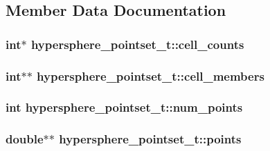 \subsection{Member Data Documentation}
\hypertarget{structhypersphere__pointset__t_aaf511e7f891ea0d2c9bb8a8e94a4b085}{
\subsubsection[{cell\_\-counts}]{\setlength{\rightskip}{0pt plus 5cm}int$\ast$ {\bf hypersphere\_\-pointset\_\-t::cell\_\-counts}}}
\label{structhypersphere__pointset__t_aaf511e7f891ea0d2c9bb8a8e94a4b085}
\hypertarget{structhypersphere__pointset__t_aa7cfbde979cf3d0cda21b816b2cc1672}{
\subsubsection[{cell\_\-members}]{\setlength{\rightskip}{0pt plus 5cm}int$\ast$$\ast$ {\bf hypersphere\_\-pointset\_\-t::cell\_\-members}}}
\label{structhypersphere__pointset__t_aa7cfbde979cf3d0cda21b816b2cc1672}
\hypertarget{structhypersphere__pointset__t_a35cb19e7a308c03236f28540a867e167}{
\subsubsection[{num\_\-points}]{\setlength{\rightskip}{0pt plus 5cm}int {\bf hypersphere\_\-pointset\_\-t::num\_\-points}}}
\label{structhypersphere__pointset__t_a35cb19e7a308c03236f28540a867e167}
\hypertarget{structhypersphere__pointset__t_a3930068cd0836f339792ee59840b1713}{
\subsubsection[{points}]{\setlength{\rightskip}{0pt plus 5cm}double$\ast$$\ast$ {\bf hypersphere\_\-pointset\_\-t::points}}}
